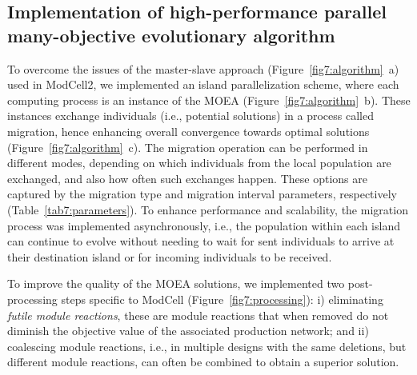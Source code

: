 \documentclass[12pt]{article}
\begin{document}
{\subsection{Implementation of high-performance parallel many-objective evolutionary algorithm}

%

To overcome the issues of the master-slave approach (Figure~\ref{fig7:algorithm}~a) used in ModCell2,\citep{garcia2019} we implemented an island parallelization scheme,\citep{alba2013} where each computing process is an instance of the MOEA (Figure~\ref{fig7:algorithm}~b).
These instances exchange individuals (i.e., potential solutions) in a process called migration, hence enhancing overall convergence towards optimal solutions (Figure~\ref{fig7:algorithm}~c).
The migration operation can be performed in different modes, depending on which individuals from the local population are exchanged, and also how often such exchanges happen.
These options are captured by the migration type and migration interval parameters, respectively (Table~\ref{tab7:parameters}).
To enhance performance and scalability, the migration process was implemented asynchronously, i.e., the population within each island can continue to evolve without needing to wait for sent individuals to arrive at their destination island or for incoming individuals to be received.

To improve the quality of the MOEA solutions, we implemented two post-processing steps specific to ModCell (Figure~\ref{fig7:processing}): i) eliminating \emph{futile module reactions}, these are module reactions that when removed do not diminish the objective value of the associated production network; and ii) coalescing module reactions, i.e., in multiple designs with the same deletions, but different module reactions, can often be combined to obtain a superior solution.

}
\end{document}
